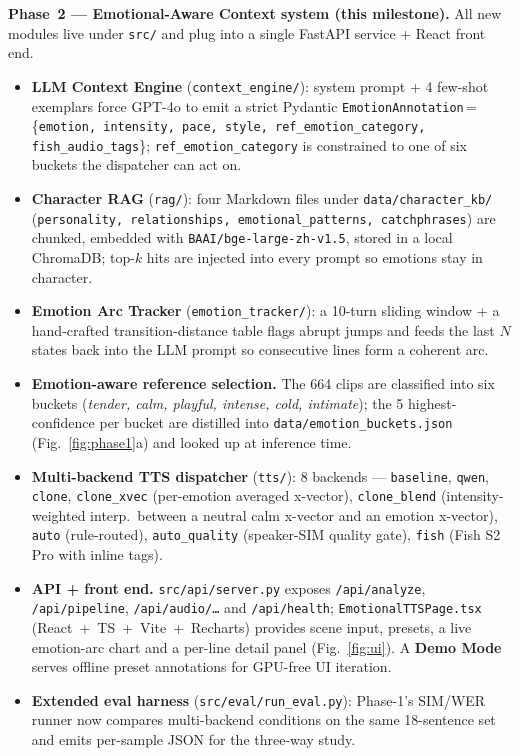 \documentclass[10pt,a4paper]{article}
\begin{document}
\textbf{Phase~2 --- Emotional-Aware Context system (this milestone).} All new modules live under \texttt{src/} and plug into a single FastAPI service + React front end.
\begin{itemize}
  \item \textbf{LLM Context Engine} (\texttt{context\_engine/}): system prompt + 4 few-shot exemplars force GPT-4o to emit a strict Pydantic \texttt{EmotionAnnotation}\,=\,\{\texttt{emotion, intensity, pace, style, ref\_emotion\_category, fish\_audio\_tags}\}; \texttt{ref\_emotion\_category} is constrained to one of six buckets the dispatcher can act on.
  \item \textbf{Character RAG} (\texttt{rag/}): four Markdown files under \texttt{data/character\_kb/} (\texttt{personality, relationships, emotional\_patterns, catchphrases}) are chunked, embedded with \texttt{BAAI/bge-large-zh-v1.5}, stored in a local ChromaDB; top-$k$ hits are injected into every prompt so emotions stay in character.
  \item \textbf{Emotion Arc Tracker} (\texttt{emotion\_tracker/}): a 10-turn sliding window + a hand-crafted transition-distance table flags abrupt jumps and feeds the last $N$ states back into the LLM prompt so consecutive lines form a coherent arc.
  \item \textbf{Emotion-aware reference selection.} The 664 clips are classified into six buckets (\emph{tender, calm, playful, intense, cold, intimate}); the 5 highest-confidence per bucket are distilled into \texttt{data/emotion\_buckets.json} (Fig.~\ref{fig:phase1}a) and looked up at inference time.
  \item \textbf{Multi-backend TTS dispatcher} (\texttt{tts/}): 8 backends --- \texttt{baseline}, \texttt{qwen}, \texttt{clone}, \texttt{clone\_xvec} (per-emotion averaged x-vector), \texttt{clone\_blend} (intensity-weighted interp.\ between a neutral calm x-vector and an emotion x-vector), \texttt{auto} (rule-routed), \texttt{auto\_quality} (speaker-SIM quality gate), \texttt{fish} (Fish S2 Pro with inline tags).
  \item \textbf{API + front end.} \texttt{src/api/server.py} exposes \texttt{/api/analyze}, \texttt{/api/pipeline}, \texttt{/api/audio/\ldots} and \texttt{/api/health}; \texttt{EmotionalTTSPage.tsx} (React~+~TS~+~Vite~+~Recharts) provides scene input, presets, a live emotion-arc chart and a per-line detail panel (Fig.~\ref{fig:ui}). A \textbf{Demo Mode} serves offline preset annotations for GPU-free UI iteration.
  \item \textbf{Extended eval harness} (\texttt{src/eval/run\_eval.py}): Phase-1's SIM/WER runner now compares multi-backend conditions on the same 18-sentence set and emits per-sample JSON for the three-way study.
\end{itemize}
\end{document}
